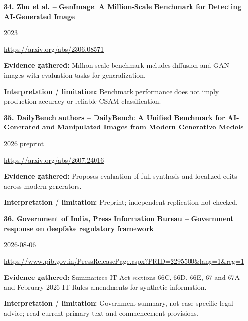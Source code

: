 \documentclass[11pt,a4paper]{article}
\begin{document}
\noindent\begin{minipage}{\linewidth}\textbf{34. Zhu et al. -- GenImage: A Million-Scale Benchmark for Detecting AI-Generated Image}\par{\small 2023\par\url{https://arxiv.org/abs/2306.08571}}\par
\textbf{Evidence gathered:} Million-scale benchmark includes diffusion and GAN images with evaluation tasks for generalization.\par\textbf{Interpretation / limitation:} Benchmark performance does not imply production accuracy or reliable CSAM classification.\par
\end{minipage}\par\vspace{2mm}
\noindent\begin{minipage}{\linewidth}\textbf{35. DailyBench authors -- DailyBench: A Unified Benchmark for AI-Generated and Manipulated Images from Modern Generative Models}\par{\small 2026 preprint\par\url{https://arxiv.org/abs/2607.24016}}\par
\textbf{Evidence gathered:} Proposes evaluation of full synthesis and localized edits across modern generators.\par\textbf{Interpretation / limitation:} Preprint; independent replication not checked.\par
\end{minipage}\par\vspace{2mm}
\noindent\begin{minipage}{\linewidth}\textbf{36. Government of India, Press Information Bureau -- Government response on deepfake regulatory framework}\par{\small 2026-08-06\par\url{https://www.pib.gov.in/PressReleasePage.aspx?PRID=2295500&lang=1&reg=1}}\par
\textbf{Evidence gathered:} Summarizes IT Act sections 66C, 66D, 66E, 67 and 67A and February 2026 IT Rules amendments for synthetic information.\par\textbf{Interpretation / limitation:} Government summary, not case-specific legal advice; read current primary text and commencement provisions.\par
\end{minipage}\par\vspace{2mm}
\end{document}
